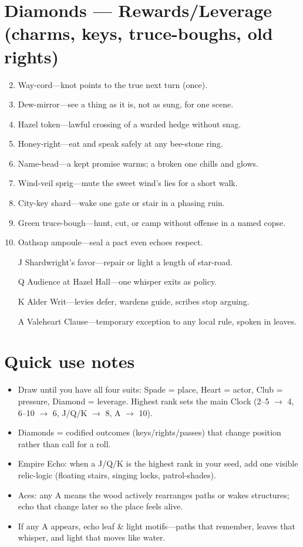 \section*{Diamonds --- Rewards/Leverage (charms, keys, truce-boughs, old rights)}
\label{sec:valewood-rewards}
\begin{enumerate}
\setcounter{enumi}{1}
\item Way-cord---knot points to the true next turn (once).
\item Dew-mirror---see a thing as it is, not as sung, for one scene.
\item Hazel token---lawful crossing of a warded hedge without snag.
\item Honey-right---eat and speak safely at any bee-stone ring.
\item Name-bead---a kept promise warms; a broken one chills and glows.
\item Wind-veil sprig---mute the sweet wind's lies for a short walk.
\item City-key shard---wake one gate or stair in a phasing ruin.
\item Green truce-bough---hunt, cut, or camp without offense in a named copse.
\item Oathsap ampoule---seal a pact even echoes respect.
\item[J] Shardwright's favor---repair or light a length of star-road.
\item[Q] Audience at Hazel Hall---one whisper exits as policy.
\item[K] Alder Writ---levies defer, wardens guide, scribes stop arguing.
\item[A] Valeheart Clause---temporary exception to any local rule, spoken in leaves.
\end{enumerate}

\section*{Quick use notes}
\label{sec:valewood-quick-use}
\begin{itemize}
\item Draw until you have all four suits: Spade = place, Heart = actor, Club = pressure, Diamond = leverage. Highest rank sets the main Clock (2--5 $\rightarrow$ 4, 6--10 $\rightarrow$ 6, J/Q/K $\rightarrow$ 8, A $\rightarrow$ 10).
\item Diamonds = codified outcomes (keys/rights/passes) that change position rather than call for a roll.
\item Empire Echo: when a J/Q/K is the highest rank in your seed, add one visible relic-logic (floating stairs, singing locks, patrol-shades).
\item Aces: any A means the wood actively rearranges paths or wakes structures; echo that change later so the place feels alive.
\item If any A appears, echo leaf \& light motifs---paths that remember, leaves that whisper, and light that moves like water.
\end{itemize}

